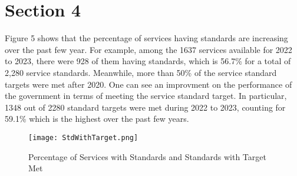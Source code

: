 \section{Section 4}

Figure 5 shows that the percentage of services having standards are
increasing over the past few year. For example, among the 1637 services 
available for 2022 to 2023, there were 928 of them having standards, 
which is 56.7\% for a total of 2,280 service standards. Meanwhile, more
than 50\% of the service standard targets were met after 2020. One can
see an improvment on the performance of the government in terms of meeting
the service standard target. In particular, 1348 out of 2280 standard 
targets were met during 2022 to 2023, counting for 59.1\% which is the 
highest over the past few years.

\begin{figure}[H]
    \centering
    \texttt{[image: StdWithTarget.png]}
    \caption{\label{fig:Std}Percentage of Services with Standards and Standards with Target Met}
\end{figure}
